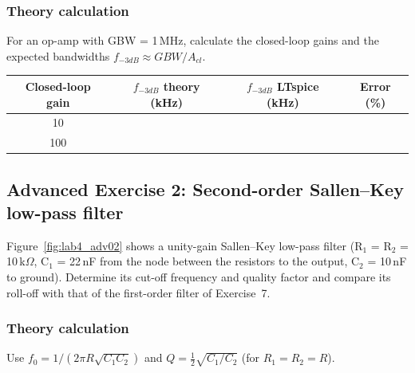 
\subsubsection{Theory calculation}\vspace{-3pt}\notesblock For an op-amp with GBW = 1\,MHz, calculate the closed-loop gains and the expected bandwidths $f_{-3dB}\approx GBW/A_{cl}$.

\begin{center}\renewcommand{\arraystretch}{1.8}\begin{tabular}{|c|c|c|c|}\hline \textbf{Closed-loop gain} & \textbf{$f_{-3dB}$ theory (kHz)} & \textbf{$f_{-3dB}$ LTspice (kHz)} & \textbf{Error (\%)}\\ \hline 10 & & & \\ \hline 100 & & & \\ \hline \end{tabular}\end{center}
\newpage

\subsection{Advanced Exercise 2: Second-order Sallen--Key low-pass filter}
Figure~\ref{fig:lab4_adv02} shows a unity-gain Sallen--Key low-pass filter (R$_1$ = R$_2$ = 10\,k$\Omega$, C$_1$ = 22\,nF from the node between the resistors to the output, C$_2$ = 10\,nF to ground). Determine its cut-off frequency and quality factor and compare its roll-off with that of the first-order filter of Exercise~7.


\subsubsection{Theory calculation}\vspace{-3pt}\notesblock Use $f_0=1/(2\pi R\sqrt{C_1C_2})$ and $Q=\tfrac12\sqrt{C_1/C_2}$ (for $R_1=R_2=R$).

